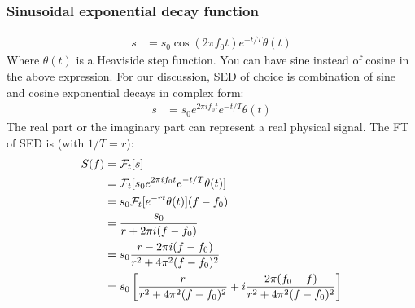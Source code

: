 \documentclass[letterpaper, 11pt]{article}
\newcommand{\fourier}[2]{\mathcal{F}_{#1}[#2]} %
\newcommand{\sed}[1]{s_{0}e^{2\pi if_{0}#1}e^{-#1/T}} %
\numberwithin{equation}{section}
\begin{document}
\subsubsection{Sinusoidal exponential decay function}
\begin{align}
	s &= s_{0}\cos{(2\pi f_{0}t)}e^{-t/T} \theta(t)
\end{align}
Where \(\theta (t)\) is a Heaviside step function. You can have sine instead of cosine in the above expression. For our discussion, SED of choice is combination of sine and cosine exponential decays in complex form:
\begin{align}
	s &= \sed{t} \theta (t)
\end{align}
The real part or the imaginary part can represent a real physical signal. The FT of SED is (with \(1/T = r\)):
\begin{equation}
	\begin{aligned}[b]
		S(f)	&= \fourier{t}{s}\\
			&= \fourier{t}{\sed{t} \theta (t)}\\
			&= s_{0}\fourier{t}{e^{-rt} \theta (t)}(f - f_{0})\\
			&= \frac{s_{0}}{r + 2\pi i(f - f_{0})} \\
			\gdef\temp{r^2 + 4\pi^{2}(f - f_{0})^2} %
			&= s_{0}\frac{r - 2\pi i(f - f_{0})}{\temp}\\
			&= s_{0}\left[\frac{r}{\temp} + i\frac{2\pi(f_{0} - f)}{\temp} \right]
	\end{aligned}
\end{equation}
\printindex
\end{document}
